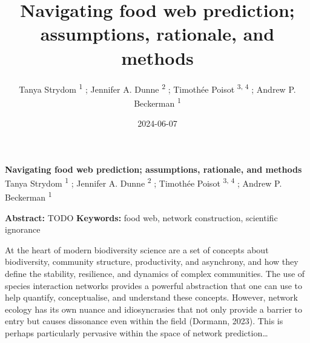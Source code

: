 \documentclass[
]{article}
\title{Navigating food web prediction; assumptions, rationale, and
methods}
\author{Tanya Strydom %
%
\textsuperscript{%
%
1%
}%
; Jennifer A. Dunne %
%
\textsuperscript{%
%
2%
}%
; Timothée Poisot %
%
\textsuperscript{%
3,%
4%
}%
; Andrew P. Beckerman %
%
\textsuperscript{%
%
1%
}%
}
\date{2024-06-07}
\begin{document}
\thispagestyle{empty}
{\bfseries\sffamily\Large Navigating food web prediction; assumptions,
rationale, and methods}
\vfil
Tanya Strydom %
%
\textsuperscript{%
%
1%
}%
; Jennifer A. Dunne %
%
\textsuperscript{%
%
2%
}%
; Timothée Poisot %
%
\textsuperscript{%
3,%
4%
}%
; Andrew P. Beckerman %
%
\textsuperscript{%
%
1%
}%

\vfil
{\small
\textbf{Abstract:} TODO
\vfil
\textbf{Keywords:} %
food web, network construction, %
scientific ignorance%
}
\clearpage
\setcounter{page}{1}
\doublespacing
\linenumbers

At the heart of modern biodiversity science are a set of concepts about
biodiversity, community structure, productivity, and asynchrony, and how
they define the stability, resilience, and dynamics of complex
communities. The use of species interaction networks provides a powerful
abstraction that one can use to help quantify, conceptualise, and
understand these concepts. However, network ecology has its own nuance
and idiosyncrasies that not only provide a barrier to entry but causes
dissonance even within the field (Dormann, 2023). This is perhaps
particularly pervasive within the space of network prediction\ldots{}
\end{document}
